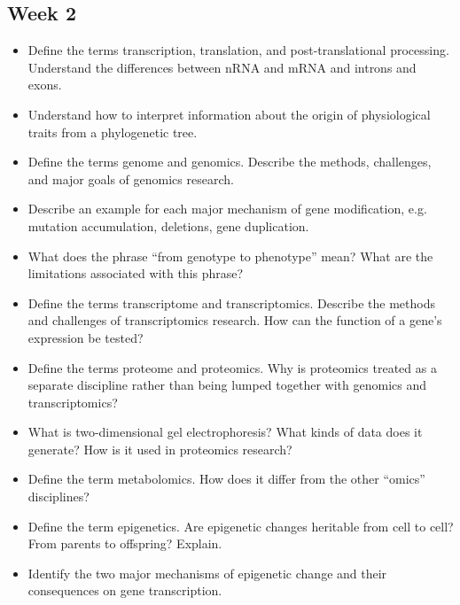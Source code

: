 \documentclass[12pt,a4paper]{article}
\begin{document}
\clearpage
{}
\subsection{Week 2}
\begin{itemize}
    \item Define the terms transcription, translation, and post-translational processing. Understand the differences between nRNA and mRNA and introns and exons. 
    \item Understand how to interpret information about the origin of physiological traits from a phylogenetic tree.
    \item Define the terms genome and genomics. Describe the methods, challenges, and major goals of genomics research.
    \item Describe an example for each major mechanism of gene modification, e.g. mutation accumulation, deletions, gene duplication.
    \item What does the phrase “from genotype to phenotype” mean? What are the limitations associated with this phrase?
    \item Define the terms transcriptome and transcriptomics. Describe the methods and challenges of transcriptomics research. How can the function of a gene’s expression be tested?
    \item Define the terms proteome and proteomics. Why is proteomics treated as a separate discipline rather than being lumped together with genomics and transcriptomics?
    \item What is two-dimensional gel electrophoresis? What kinds of data does it generate? How is it used in proteomics research?
    \item Define the term metabolomics. How does it differ from the other “omics” disciplines?
    \item Define the term epigenetics. Are epigenetic changes heritable from cell  to cell? From parents to offspring? Explain.
    \item Identify the two major mechanisms of epigenetic change and their consequences on gene transcription.
\end{itemize}

\clearpage
{}
\end{document}
